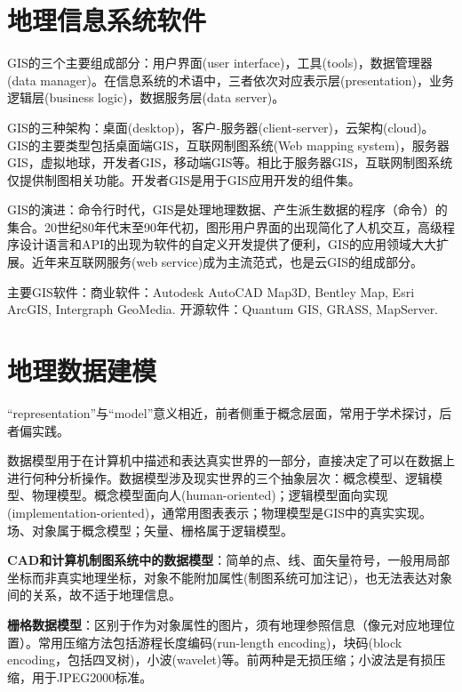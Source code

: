 \section{地理信息系统软件}

\par GIS的三个主要组成部分：用户界面(user interface)，工具(tools)，数据管理器(data manager)。在信息系统的术语中，三者依次对应表示层(presentation)，业务逻辑层(business logic)，数据服务层(data server)。

\par GIS的三种架构：桌面(desktop)，客户-服务器(client-server)，云架构(cloud)。GIS的主要类型包括桌面端GIS，互联网制图系统(Web mapping system)，服务器GIS，虚拟地球，开发者GIS，移动端GIS等。相比于服务器GIS，互联网制图系统仅提供制图相关功能。开发者GIS是用于GIS应用开发的组件集。

\par GIS的演进：命令行时代，GIS是处理地理数据、产生派生数据的程序（命令）的集合。20世纪80年代末至90年代初，图形用户界面的出现简化了人机交互，高级程序设计语言和API的出现为软件的自定义开发提供了便利，GIS的应用领域大大扩展。近年来互联网服务(web service)成为主流范式，也是云GIS的组成部分。

\par 主要GIS软件：商业软件：Autodesk AutoCAD Map3D, Bentley Map, Esri ArcGIS, Intergraph GeoMedia. 开源软件：Quantum GIS, GRASS, MapServer. 

\section{地理数据建模}

\par ``representation''与``model''意义相近，前者侧重于概念层面，常用于学术探讨，后者偏实践。

\par 数据模型用于在计算机中描述和表达真实世界的一部分，直接决定了可以在数据上进行何种分析操作。数据模型涉及现实世界的三个抽象层次：概念模型、逻辑模型、物理模型。概念模型面向人(human-oriented)；逻辑模型面向实现(implementation-oriented)，通常用图表表示；物理模型是GIS中的真实实现。场、对象属于概念模型；矢量、栅格属于逻辑模型。

\par \textbf{CAD和计算机制图系统中的数据模型}：简单的点、线、面矢量符号，一般用局部坐标而非真实地理坐标，对象不能附加属性(制图系统可加注记)，也无法表达对象间的关系，故不适于地理信息。

\par \textbf{栅格数据模型}：区别于作为对象属性的图片，须有地理参照信息（像元对应地理位置）。常用压缩方法包括游程长度编码(run-length encoding)，块码(block encoding，包括四叉树)，小波(wavelet)等。前两种是无损压缩；小波法是有损压缩，用于JPEG2000标准。

